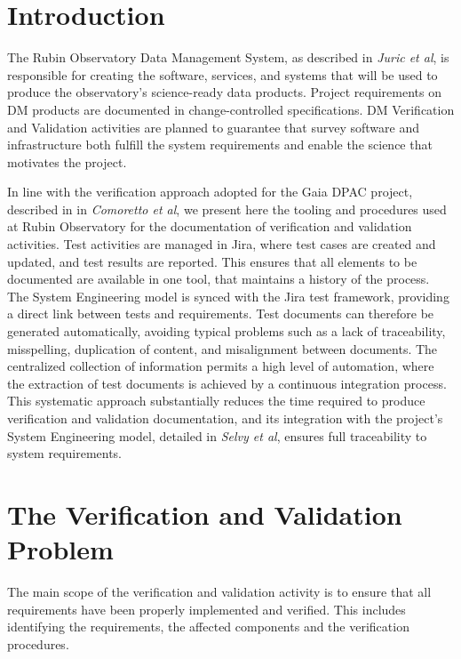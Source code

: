 \section{Introduction}

The Rubin Observatory Data Management System, as described in \textit{Juric et al}\cite{2015arXiv151207914J},
is responsible for creating the software, services, and systems that will be used to
produce the observatory's science-ready data products.  Project requirements on DM
products are documented in change-controlled specifications. DM Verification and Validation activities are planned
to guarantee that survey software and infrastructure both fulfill the system requirements and enable the science that
motivates the project.

In line with the verification approach adopted for the Gaia DPAC project, described in in \textit{Comoretto et al}\cite{10.1117/12.926797},
we present here the tooling and procedures used at Rubin Observatory for the documentation of verification and
validation activities. Test activities are managed in Jira, where test cases are created and updated, and test results
are reported. This ensures that all elements to be documented are available in one tool, that maintains a history of
the process. The System Engineering model is synced with the Jira test framework, providing a direct link between
tests and requirements. Test documents can therefore be generated automatically, avoiding typical problems
such as a lack of traceability, misspelling, duplication of content, and misalignment between documents. The
centralized collection of information permits a high level of automation, where the extraction of test documents is
achieved by a continuous integration process. This systematic approach substantially reduces the time required to
produce verification and validation documentation, and its integration with the project's System Engineering model,
detailed in \textit{Selvy et al}\cite{10.1117/12.2310125}, ensures full traceability to system requirements.


\section{The Verification and Validation Problem}

The main scope of the verification and validation activity is to ensure that all requirements have been properly implemented and verified.
This includes identifying the requirements, the affected components and the verification procedures.

